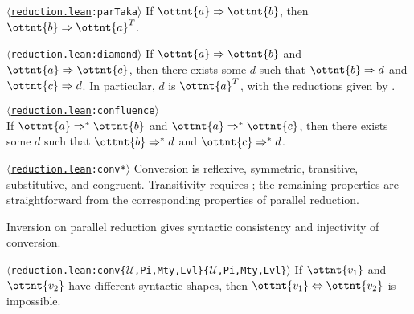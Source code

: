 \documentclass[a4paper,UKenglish,cleveref,autoref,thm-restate]{lipics-v2021}
\newcommand{\repo}{https://github.com/ionathanch/TTBFL}
\newcommand{\thmref}[2]{%
  $\langle$\href{\repo/tree/main/src/#1}{\texttt{#1}}\texttt{:#2}$\rangle$%
}
\begin{document}
\begin{lemma}[Completion (p.r.)] \thmref{reduction.lean}{parTaka} \label{lem:par:compl}
  If $ \ottnt{a}  \Rightarrow  \ottnt{b} $, then $ \ottnt{b}  \Rightarrow   \ottnt{a} ^{ \mathsf{T} }  $.
\end{lemma}

\begin{corollary}[Diamond (p.r.)] \thmref{reduction.lean}{diamond} \label{lem:par:diamond}
  If $ \ottnt{a}  \Rightarrow  \ottnt{b} $ and $ \ottnt{a}  \Rightarrow  \ottnt{c} $,
  then there exists some $d$ such that $ \ottnt{b}  \Rightarrow  d $ and $ \ottnt{c}  \Rightarrow  d $.
  In particular, $d$ is $ \ottnt{a} ^{ \mathsf{T} } $,
  with the reductions given by .
\end{corollary}

\begin{theorem}[Confluence (p.r.)] \thmref{reduction.lean}{confluence} \label{lem:par:confl} \\
  If $ \ottnt{a}  \Rightarrow^\ast  \ottnt{b} $ and $ \ottnt{a}  \Rightarrow^\ast  \ottnt{c} $,
  then there exists some $d$ such that $ \ottnt{b}  \Rightarrow^\ast  d $ and $ \ottnt{c}  \Rightarrow^\ast  d $.
\end{theorem}

\begin{corollary} \thmref{reduction.lean}{conv*} \label{lem:conv}
  Conversion is reflexive, symmetric, transitive, substitutive, and congruent.
  Transitivity requires ;
  the remaining properties are straightforward
  from the corresponding properties of parallel reduction.
\end{corollary}

Inversion on parallel reduction gives syntactic consistency and injectivity of conversion.

\begin{lemma} \thmref{reduction.lean}{conv\{$\mathcal{U}$,Pi,Mty,Lvl\}\{$\mathcal{U}$,Pi,Mty,Lvl\}} \label{lem:par:consistency}
  If $\ottnt{v_{{\mathrm{1}}}}$ and $\ottnt{v_{{\mathrm{2}}}}$ have different syntactic shapes,
  then $ \ottnt{v_{{\mathrm{1}}}}  \Leftrightarrow  \ottnt{v_{{\mathrm{2}}}} $ is impossible.
\end{lemma}
\end{document}
